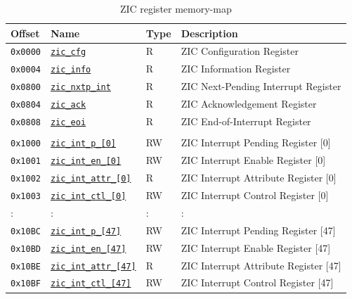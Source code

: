 \vspace{1.25cm}
\begin{table}[H]
    \centering
    \caption{ZIC register memory-map}
    \label{tab:zic-reg-memory-map}
    \vspace{0.75cm}
    \begin{tabular}{l l l l}
    \hline 
        \textbf{Offset} & \textbf{Name} & \textbf{Type} & \textbf{Description}  \\ \hline \hline
        \texttt{0x0000} & \texttt{\hyperref[subsec:zic-cfg]{zic\_cfg}} & R & ZIC Configuration Register \\ \hline
        \texttt{0x0004} & \texttt{\hyperref[subsec:zic-info]{zic\_info}} & R & ZIC Information Register \\ \hline
        \texttt{0x0800} & \texttt{\hyperref[subsec:zic-nxtp-int]{zic\_nxtp\_int}} & R & ZIC Next-Pending Interrupt Register \\ \hline
        \texttt{0x0804} & \texttt{\hyperref[subsec:zic-ack]{zic\_ack}} & R & ZIC Acknowledgement Register \\ \hline
         \texttt{0x0808} & \texttt{\hyperref[subsec:zic-eoi]{zic\_eoi}} & R & ZIC End-of-Interrupt Register \\ \hline 
         & & &  \\ \hline
         \texttt{0x1000} & \texttt{\hyperref[subsec:zic-int-p]{zic\_int\_p\_[0]}} & RW & ZIC Interrupt Pending Register [0] \\ \hline
         \texttt{0x1001} & \texttt{\hyperref[subsec:zic-int-en]{zic\_int\_en\_[0]}} & RW & ZIC Interrupt Enable Register [0]\\ \hline
         \texttt{0x1002} & \texttt{\hyperref[subsec:zic-int-attr]{zic\_int\_attr\_[0]}} & R & ZIC Interrupt Attribute Register [0] \\ \hline
         \texttt{0x1003} & \texttt{\hyperref[subsec:zic-int-ctl]{zic\_int\_ctl\_[0]}} & RW & ZIC Interrupt Control Register [0] \\ \hline
         : & : & : & : \\ \hline
         \texttt{0x10BC} & \texttt{\hyperref[subsec:zic-int-p]{zic\_int\_p\_[47]}} & RW & ZIC Interrupt Pending Register [47]\\ \hline
         \texttt{0x10BD} & \texttt{\hyperref[subsec:zic-int-en]{zic\_int\_en\_[47]}} & RW & ZIC Interrupt Enable Register [47] \\ \hline
         \texttt{0x10BE} & \texttt{\hyperref[subsec:zic-int-attr]{zic\_int\_attr\_[47]}} & R & ZIC Interrupt Attribute Register [47] \\ \hline
         \texttt{0x10BF} & \texttt{\hyperref[subsec:zic-int-ctl]{zic\_int\_ctl\_[47]}} & RW & ZIC Interrupt Control Register [47] \\ \hline
        \end{tabular}
\end{table}

